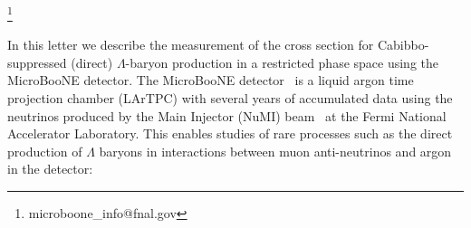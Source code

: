 \documentclass[aps,prl,twocolumn,superscriptaddress]{revtex4}
\begin{document}
\thanks{microboone\_info@fnal.gov}\noaffiliation


\begin{abstract}
We present the first measurement of the cross section of Cabibbo-suppressed $\Lambda$ baryon production, using data collected with the MicroBooNE detector when exposed to the neutrinos from the Main Injector beam at the Fermi National Accelerator Laboratory. The data analyzed correspond to $2.2 \times 10^{20}$ protons on target of neutrino mode running and $4.9 \times 10^{20}$ protons on target of anti-neutrino mode running. An automated selection is combined with hand scanning, with the former identifying five candidate $\Lambda$ production events when the signal was unblinded, consistent with the GENIE prediction of $5.3 \pm 1.1$ events. Several scanners were employed, selecting between three and five events, compared with a prediction from a blinded Monte Carlo simulation study of $3.7 \pm 1.0$ events. Restricting the phase space to only include $\Lambda$ baryons that decay above MicroBooNE's detection thresholds, we obtain a flux averaged cross section of $2.0^{+2.2}_{-1.7} \times 10^{-40}$ cm$^2/$Ar, where statistical and systematic uncertainties are combined.

\end{abstract}

\maketitle


In this letter we describe the measurement of the cross section for Cabibbo-suppressed (direct) $\Lambda$-baryon production in a restricted phase space using the MicroBooNE detector. The MicroBooNE detector~\cite{MicroBooNE:2016pwy} is a liquid argon time projection chamber (LArTPC) with several years of accumulated data using the neutrinos produced by the Main Injector (NuMI) beam~\cite{MINERvA:2016iqn,Adamson:2015dkw} at the Fermi National Accelerator Laboratory. This enables studies of rare processes such as the direct production of $\Lambda$ baryons in interactions between muon anti-neutrinos and argon in the detector:
\end{document}
